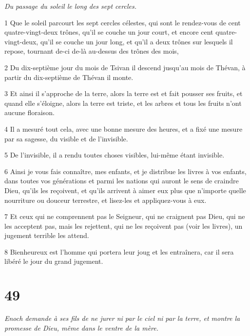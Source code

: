 \par \textit{Du passage du soleil le long des sept cercles.}

\par 1 Que le soleil parcourt les sept cercles célestes, qui sont le rendez-vous de cent quatre-vingt-deux trônes, qu'il se couche un jour court, et encore cent quatre-vingt-deux, qu'il se couche un jour long, et qu'il a deux trônes sur lesquels il repose, tournant de-ci de-là au-dessus des trônes des mois,

\par 2 Du dix-septième jour du mois de Tsivan il descend jusqu'au mois de Thévan, à partir du dix-septième de Thévan il monte.

\par 3 Et ainsi il s'approche de la terre, alors la terre est et fait pousser ses fruits, et quand elle s'éloigne, alors la terre est triste, et les arbres et tous les fruits n'ont aucune floraison.

\par 4 Il a mesuré tout cela, avec une bonne mesure des heures, et a fixé une mesure par sa sagesse, du visible et de l'invisible.

\par 5 De l'invisible, il a rendu toutes choses visibles, lui-même étant invisible.

\par 6 Ainsi je vous fais connaître, mes enfants, et je distribue les livres à vos enfants, dans toutes vos générations et parmi les nations qui auront le sens de craindre Dieu, qu'ils les reçoivent, et qu'ils arrivent à aimer eux plus que n'importe quelle nourriture ou douceur terrestre, et lisez-les et appliquez-vous à eux.

\par 7 Et ceux qui ne comprennent pas le Seigneur, qui ne craignent pas Dieu, qui ne les acceptent pas, mais les rejettent, qui ne les reçoivent pas (voir les livres), un jugement terrible les attend.

\par 8 Bienheureux est l'homme qui portera leur joug et les entraînera, car il sera libéré le jour du grand jugement.

\chapter{49}

\par \textit{Enoch demande à ses fils de ne jurer ni par le ciel ni par la terre, et montre la promesse de Dieu, même dans le ventre de la mère.}

